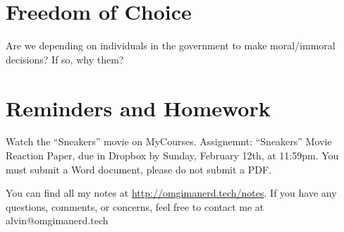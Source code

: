 \documentclass[letterpaper, 12pt]{article}
\begin{document}
\section*{Freedom of Choice}
Are we depending on individuals in the government to make moral/immoral
decisions? If so, why them?

\section*{Reminders and Homework}
Watch the ``Sneakers'' movie on MyCourses.
Assignemnt: ``Sneakers'' Movie Reaction Paper, due in Dropbox by Sunday,
February 12th, at 11:59pm. You must submit a Word document, please do not
submit a PDF.

\begin{center}
  You can find all my notes at \url{http://omgimanerd.tech/notes}. If you have
  any questions, comments, or concerns, feel free to contact me at
  alvin@omgimanerd.tech
\end{center}
\end{document}
